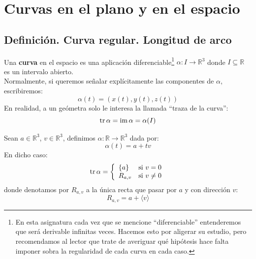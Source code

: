 \chapter{Curvas en el plano y en el espacio}
\section{Definición. Curva regular. Longitud de arco}
\begin{definicion}
    Una \textbf{curva} en el espacio es una aplicación diferenciable\footnote{En esta asignatura cada vez que se mencione ``diferenciable'' entenderemos que será derivable infinitas veces. Hacemos esto por aligerar su estudio, pero recomendamos al lector que trate de averiguar qué hipótesis hace falta imponer sobra la regularidad de cada curva en cada caso.} $\alpha:I\to \mathbb{R}^3$ donde $I\subseteq \mathbb{R}$ es un intervalo abierto.\\

    \noindent
    Normalmente, si queremos señalar explícitamente las componentes de $\alpha$, escribiremos:
    \begin{equation*}
        \alpha(t) = (x(t), y(t), z(t))
    \end{equation*}
    En realidad, a un geómetra solo le interesa la llamada ``traza de la curva'':
    \begin{equation*}
        \operatorname{tr} \alpha = \operatorname{im} \alpha = \alpha(I)
    \end{equation*}
\end{definicion}

\begin{ejemplo}
    Sean $a\in \mathbb{R}^3$, $v\in \mathbb{R}^3$, definimos $\alpha:\mathbb{R}\to \mathbb{R}^3$ dada por:
    \begin{equation*}
        \alpha(t) = a + tv 
    \end{equation*}
    En dicho caso:
    \begin{equation*}
        \operatorname{tr} \alpha = \left\{\begin{array}{ll}
            \{a\} & \text{si\ } v=0 \\
             R_{a,v} & \text{si\ } v\neq 0
        \end{array}\right. 
    \end{equation*}
    donde denotamos por $R_{a,v}$ a la única recta que pasar por $a$ y con dirección $v$:
    \begin{equation*}
        R_{a,v} = a + \langle v \rangle 
    \end{equation*}

    \begin{figure}[H]
        \centering
    \end{figure}
\end{ejemplo}

